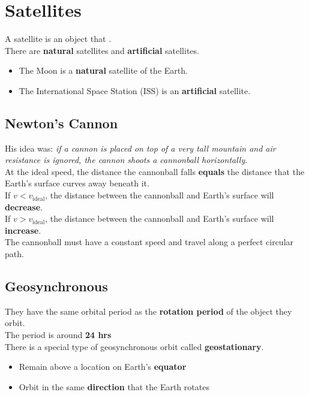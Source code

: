\section{Satellites}
A satellite is an object that .\\

There are \textbf{natural} satellites and \textbf{artificial} satellites.
\begin{itemize}
    \item The Moon is a \textbf{natural} satellite of the Earth.
    \item The International Space Station (ISS) is an \textbf{artificial} satellite.
\end{itemize}

\subsection{Newton's Cannon}
His idea was: \textit{if a cannon is placed on top of a very tall mountain and air resistance is ignored, the cannon 
shoots a cannonball horizontally}.\\

At the ideal speed, the distance the cannonball falls \textbf{equals} the distance that the Earth's surface curves away beneath it.\\

If $v < v_{\text{ideal}}$, the distance between the cannonball and Earth's surface will \textbf{decrease}.\\

If $v > v_{\text{ideal}}$, the distance between the cannonball and Earth's surface will \textbf{increase}.\\

The cannonball must have a constant speed and travel along a perfect circular path.

\subsection{Geosynchronous}
They have the same orbital period as the \textbf{rotation period} of the object they orbit.\\

The period is around \textbf{24 hrs}\\

There is a special type of geosynchronous orbit called \textbf{geostationary}.
\begin{itemize}
    \item Remain above a location on Earth's \textbf{equator}
    \item Orbit in the same \textbf{direction} that the Earth rotates
\end{itemize}

